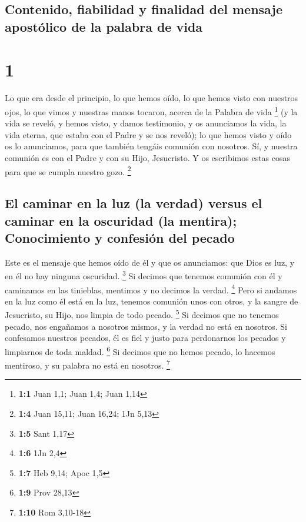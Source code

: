 \hypertarget{contenido-fiabilidad-y-finalidad-del-mensaje-apostuxf3lico-de-la-palabra-de-vida}{%
\subsection{Contenido, fiabilidad y finalidad del mensaje apostólico de
la palabra de
vida}\label{contenido-fiabilidad-y-finalidad-del-mensaje-apostuxf3lico-de-la-palabra-de-vida}}

\hypertarget{section}{%
\section{1}\label{section}}

 Lo que era desde el principio, lo que hemos oído, lo que
hemos visto con nuestros ojos, lo que vimos y nuestras manos tocaron,
acerca de la Palabra de vida \footnote{\textbf{1:1} Juan 1,1; Juan 1,4;
  Juan 1,14}  (y la vida se reveló, y hemos visto, y damos
testimonio, y os anunciamos la vida, la vida eterna, que estaba con el
Padre y se nos reveló);  lo que hemos visto y oído os lo
anunciamos, para que también tengáis comunión con nosotros. Sí, y
nuestra comunión es con el Padre y con su Hijo, Jesucristo.
 Y os escribimos estas cosas para que se cumpla nuestro
gozo. \footnote{\textbf{1:4} Juan 15,11; Juan 16,24; 1Jn 5,13}

\hypertarget{el-caminar-en-la-luz-la-verdad-versus-el-caminar-en-la-oscuridad-la-mentira-conocimiento-y-confesiuxf3n-del-pecado}{%
\subsection{El caminar en la luz (la verdad) versus el caminar en la
oscuridad (la mentira); Conocimiento y confesión del
pecado}\label{el-caminar-en-la-luz-la-verdad-versus-el-caminar-en-la-oscuridad-la-mentira-conocimiento-y-confesiuxf3n-del-pecado}}

 Este es el mensaje que hemos oído de él y que os
anunciamos: que Dios es luz, y en él no hay ninguna oscuridad.
\footnote{\textbf{1:5} Sant 1,17}  Si decimos que tenemos
comunión con él y caminamos en las tinieblas, mentimos y no decimos la
verdad. \footnote{\textbf{1:6} 1Jn 2,4}  Pero si andamos
en la luz como él está en la luz, tenemos comunión unos con otros, y la
sangre de Jesucristo, su Hijo, nos limpia de todo pecado. \footnote{\textbf{1:7}
  Heb 9,14; Apoc 1,5}  Si decimos que no tenemos pecado,
nos engañamos a nosotros mismos, y la verdad no está en nosotros.
 Si confesamos nuestros pecados, él es fiel y justo para
perdonarnos los pecados y limpiarnos de toda maldad. \footnote{\textbf{1:9}
  Prov 28,13}  Si decimos que no hemos pecado, lo hacemos
mentiroso, y su palabra no está en nosotros. \footnote{\textbf{1:10} Rom
  3,10-18}

